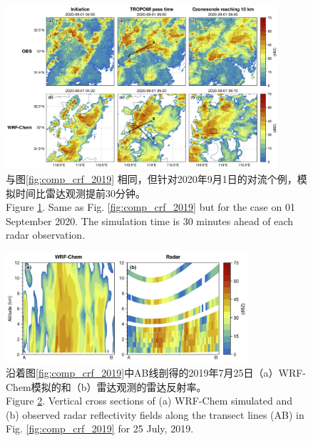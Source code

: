 \begin{figure}[!htbp]
\centering
\includegraphics[width=0.9\textwidth]{./figures/comp_crf_2020.png}
\caption{与图\ref{fig:comp_crf_2019} 相同，但针对2020年9月1日的对流个例，模拟时间比雷达观测提前30分钟。\\
Figure \ref{fig:comp_crf_2020}. Same as Fig. \ref{fig:comp_crf_2019} but for the case on 01 September 2020.
The simulation time is 30 minutes ahead of each radar observation.}
\label{fig:comp_crf_2020}
\end{figure}

\begin{figure}[!htbp]
\centering
\includegraphics[width=0.8\textwidth]{./figures/comp_dbzcross_2019.png}
\caption{沿着图\ref{fig:comp_crf_2019}中AB线剖得的2019年7月25日（a）WRF-Chem模拟的和（b）雷达观测的雷达反射率。\\
Figure \ref{fig:comp_dbzcross_2019}. Vertical cross sections of (a) WRF-Chem simulated and (b) observed radar reflectivity fields along the transect lines (AB) in Fig. \ref{fig:comp_crf_2019} for 25 July, 2019.}
\label{fig:comp_dbzcross_2019}
\end{figure}

